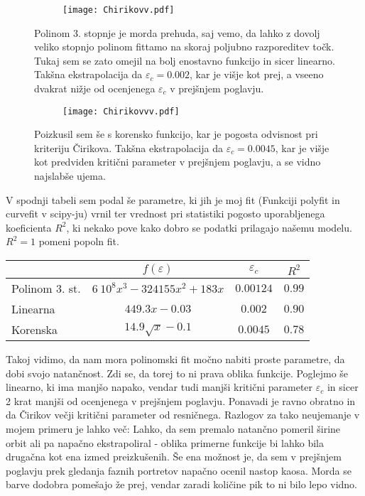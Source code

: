 \documentclass{article}
\begin{document}
\begin{figure}[H]
\centering
\begin{subfigure}{.7\textwidth}
\texttt{[image: Chirikovv.pdf]}
\end{subfigure}
\caption*{Polinom 3. stopnje je morda prehuda, saj vemo, da lahko z dovolj veliko stopnjo polinom fittamo na skoraj poljubno razporeditev točk. Tukaj sem se zato omejil na bolj enostavno funkcijo in sicer linearno. Takšna ekstrapolacija da $\varepsilon_c = 0.002$, kar je višje kot prej, a vseeno dvakrat nižje od ocenjenega $\varepsilon_c$ v prejšnjem poglavju.}
\end{figure}

\begin{figure}[H]
\centering
\begin{subfigure}{.7\textwidth}
\texttt{[image: Chirikovvv.pdf]}
\end{subfigure}
\caption*{Poizkusil sem še s korensko funkcijo, kar je pogosta odvisnost pri kriteriju Čirikova. Takšna ekstrapolacija da $\varepsilon_c = 0.0045$, kar je višje kot predviden kritični parameter v prejšnjem poglavju, a se vidno najslabše ujema.}
\end{figure}

\begin{center}
V spodnji tabeli sem podal še parametre, ki jih je moj fit (Funkciji polyfit in curvefit v scipy-ju) vrnil ter vrednost pri statistiki pogosto uporabljenega koeficienta $R^2$, ki nekako pove kako dobro se podatki prilagajo našemu modelu. $R^2 = 1$ pomeni popoln fit.
\begin{tabular}{ |  l  | c   c  c | }
\hline
    &  $f(\varepsilon)$  & $\varepsilon_c$ & $R^2$  \\ \hline
  Polinom 3. st.& $6\ 10^8 x^3 - 324155 x^2 + 183x$  & $0.00124$ & $0.99$ \\
  Linearna & $449.3 x - 0.03$ & $0.002$ & $0.90$ \\
  Korenska & $14.9 \sqrt{x} - 0.1$ & $0.0045$ & $0.78$\\
\hline
\end{tabular}
\end{center}


Takoj vidimo, da nam mora polinomski fit močno nabiti proste parametre, da dobi svojo natančnost. Zdi se, da torej to ni prava oblika funkcije. 
Poglejmo še linearno, ki ima manjšo napako, vendar tudi manjši kritični parameter $\varepsilon_c$ in sicer 2 krat manjši od ocenjenega v prejšnjem poglavju. Ponavadi je ravno obratno in da Čirikov večji kritični parameter od resničnega. Razlogov za tako neujemanje v mojem primeru je lahko več: Lahko, da sem premalo natančno pomeril širine orbit ali pa napačno ekstrapoliral - oblika primerne funkcije bi lahko bila drugačna kot ena izmed preizkušenih. Še ena možnost je, da sem v prejšnjem poglavju prek gledanja faznih portretov napačno ocenil nastop kaosa. Morda se barve dodobra pomešajo že prej, vendar zaradi količine pik to ni bilo lepo vidno. 
\end{document}
